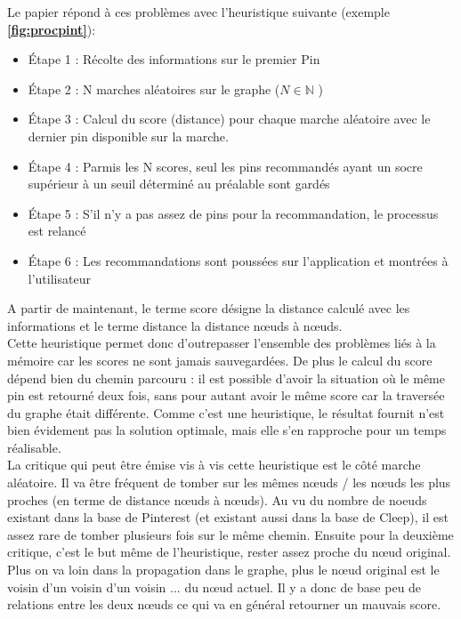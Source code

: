 \documentclass{article} %
\begin{document}
Le papier répond à ces problèmes avec l'heuristique suivante (exemple \textbf{\ref{fig:procpint}}):
\begin{itemize}
	\itemsep 0em
	\item Étape 1 : Récolte des informations sur le premier Pin
	\item Étape 2 : N marches aléatoires sur le graphe ($N \in \mathbb{N}$ )
	\item Étape 3 : Calcul du score (distance) pour chaque marche aléatoire avec le dernier pin disponible sur la marche.
	\item Étape 4 : Parmis les N scores, seul les pins recommandés ayant un socre supérieur à un seuil déterminé au préalable sont gardés
	\item Étape 5 : S'il n'y a pas assez de pins pour la recommandation, le processus est relancé 
	\item Étape 6 : Les recommandations sont poussées sur l'application et montrées à l'utilisateur
\end{itemize}
A partir de maintenant, le terme score désigne la distance calculé avec les informations et le terme distance la distance nœuds à nœuds.\\
Cette heuristique permet donc d'outrepasser l'ensemble des problèmes liés à la mémoire car les scores ne sont jamais sauvegardées. De plus le calcul du score dépend bien du chemin parcouru : il est possible d'avoir la situation où le même pin est retourné deux fois, sans pour autant avoir le même score car la traversée du graphe était différente. Comme c'est une heuristique, le résultat fournit n'est bien évidement pas la solution optimale, mais elle s'en rapproche pour un temps réalisable.\\
La critique qui peut être émise vis à vis cette heuristique est le côté marche aléatoire. Il va être fréquent de tomber sur les mêmes nœuds / les nœuds les plus proches (en terme de distance nœuds à nœuds). Au vu du nombre de noeuds existant dans la base de Pinterest (et existant aussi dans la base de Cleep), il est assez rare de tomber plusieurs fois sur le même chemin. Ensuite pour la deuxième critique, c'est le but même de l'heuristique, rester assez proche du nœud original. Plus on va loin dans la propagation dans le graphe, plus le nœud original est le voisin d'un voisin d'un voisin ... du nœud actuel. Il y a donc de base peu de relations entre les deux nœuds ce qui va en général retourner un mauvais score.\\
\end{document}
